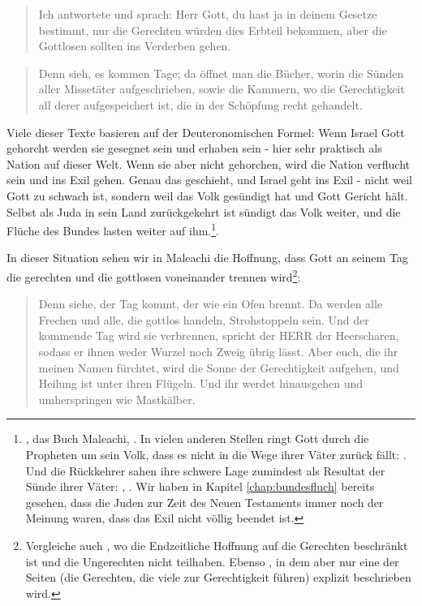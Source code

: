 \begin{quote}
	Ich antwortete und sprach: Herr Gott, du hast ja in deinem Gesetze bestimmt,
	nur die Gerechten würden dies Erbteil bekommen, aber die Gottlosen sollten ins Verderben gehen.
\end{quote}

\begin{quote}
	Denn sieh, es kommen Tage;
da öffnet man die Bücher,
worin die Sünden aller Missetäter aufgeschrieben,
sowie die Kammern,
wo die Gerechtigkeit all derer aufgespeichert ist,
die in der Schöpfung recht gehandelt.
\end{quote}

Viele dieser Texte basieren auf der Deuteronomischen Formel:
Wenn Israel Gott gehorcht werden sie gesegnet sein und erhaben sein - hier sehr praktisch als Nation auf dieser Welt.
Wenn sie aber nicht gehorchen, wird die Nation verflucht sein und ins Exil gehen.
Genau das geschieht, und Israel geht ins Exil - nicht weil Gott zu schwach ist, sondern weil das Volk gesündigt hat und Gott Gericht hält.
Selbst als Juda in sein Land zurückgekehrt ist sündigt das Volk weiter, und die Flüche des Bundes lasten weiter auf ihm.\footnote{
	, das Buch Maleachi, .
	In vielen anderen Stellen ringt Gott durch die Propheten um sein Volk, dass es nicht in die Wege ihrer Väter zurück fällt: .
	Und die Rückkehrer sahen ihre schwere Lage zumindest als Resultat der Sünde ihrer Väter: , .
	Wir haben in Kapitel \ref{chap:bundesfluch} bereits gesehen, dass die Juden zur Zeit des Neuen Testaments immer noch der Meinung waren, dass
	das Exil nicht völlig beendet ist.
}.

In dieser Situation sehen wir in Maleachi die Hoffnung, dass Gott an seinem Tag die gerechten und die gottlosen voneinander trennen wird\footnote{
	Vergleiche auch , wo die Endzeitliche Hoffnung auf die Gerechten beschränkt ist und die Ungerechten nicht teilhaben.
	Ebenso , in dem aber nur eine der Seiten (die Gerechten, die viele zur Gerechtigkeit führen) explizit beschrieben wird.
}:
\begin{quote}
	Denn siehe, der Tag kommt, der wie ein Ofen brennt. Da werden alle Frechen und alle, die gottlos handeln, Strohstoppeln sein. Und der kommende Tag wird sie verbrennen, spricht der HERR der Heerscharen, sodass er ihnen weder Wurzel noch Zweig übrig lässt.
	Aber euch, die ihr meinen Namen fürchtet, wird die Sonne der Gerechtigkeit aufgehen, und Heilung ist unter ihren Flügeln. Und ihr werdet hinausgehen und umherspringen wie Mastkälber.
\end{quote}

